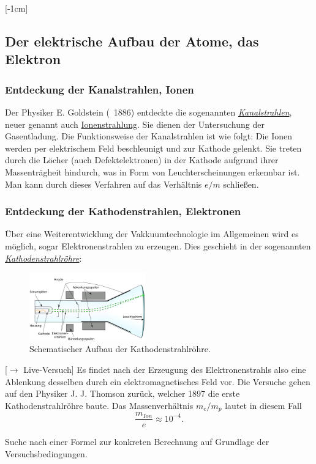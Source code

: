 \documentclass[]{subfiles}
\begin{document}
    [-1cm]
    \subsection{Der elektrische Aufbau der Atome, das Elektron}
        \subsubsection*{Entdeckung der Kanalstrahlen, Ionen}
            Der Physiker E. Goldstein (~1886) entdeckte die sogenannten \href{https://de.wikipedia.org/wiki/Kanalstrahlen}{\emph{Kanalstrahlen}}, neuer genannt auch \href{https://de.wikipedia.org/w/index.php?title=Ionenstrahlung&redirect=no}{Ionenstrahlung}. Sie dienen der Untersuchung der Gasentladung. Die Funktionsweise der Kanalstrahlen ist wie folgt:
            Die Ionen werden per elektrischem Feld beschleunigt und zur Kathode gelenkt. Sie treten durch die Löcher (auch Defektelektronen) in der Kathode aufgrund ihrer Massenträgheit hindurch, was in Form von Leuchterscheinungen erkennbar ist. 
            Man kann durch dieses Verfahren auf das Verhältnis $e/m$ schließen. 

        \subsubsection*{Entdeckung der Kathodenstrahlen, Elektronen}\label{Ub:Kathodenstrahl}\marginnote{$\to$ \hyperref[Ub:AtomEigenschaften]{\faBook}}
            Über eine Weiterentwicklung der Vakkuumtechnologie im Allgemeinen wird es möglich, sogar Elektronenstrahlen zu erzeugen. Dies geschieht in der sogenannten \href{https://de.wikipedia.org/wiki/Kathodenstrahlröhre}{\textit{Kathodenstrahlröhre}}:
            \begin{figure}[H]
                \centering
                \includegraphics[width=5cm]{Bilddateien/Kathodenstrahlroehre.png}
                \caption{Schematischer Aufbau der Kathodenstrahlröhre.}
            \end{figure}
            [$\to$ Live-Versuch] Es findet nach der Erzeugung des Elektronenstrahls also eine Ablenkung desselben durch ein elektromagnetisches Feld vor. Die Versuche gehen auf den Physiker J. J. Thomson zurück, welcher 1897 die erste Kathodenstrahlröhre baute. 
            Das Massenverhältnis $m_e/m_p$ lautet in diesem Fall 
            \[\frac{m_{Ion}}{e}\approx 10^{-4}.\]
            \begin{Aufgabe}
                \nr{} Suche nach einer Formel zur konkreten Berechnung auf Grundlage der Versuchsbedingungen.
            \end{Aufgabe}
            
\end{document}

